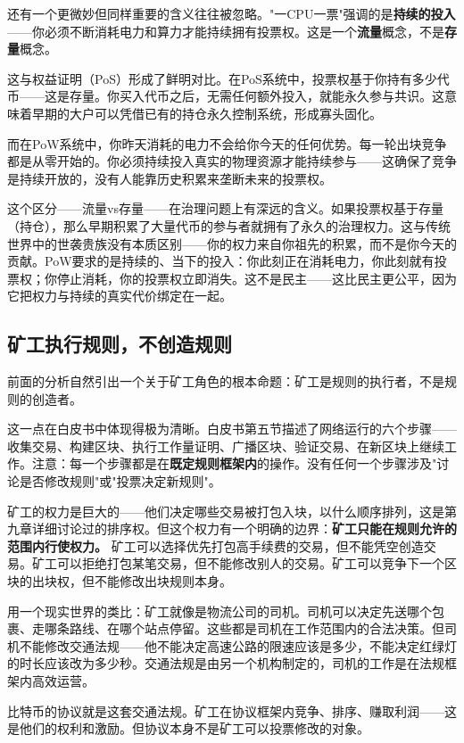 \documentclass[a4paper,12pt,openany]{ctexbook}
\begin{document}
还有一个更微妙但同样重要的含义往往被忽略。"一CPU一票"强调的是\textbf{持续的投入}——你必须不断消耗电力和算力才能持续拥有投票权。这是一个\textbf{流量}概念，不是\textbf{存量}概念。

这与权益证明（PoS）形成了鲜明对比。在PoS系统中，投票权基于你持有多少代币——这是存量。你买入代币之后，无需任何额外投入，就能永久参与共识。这意味着早期的大户可以凭借已有的持仓永久控制系统，形成寡头固化。

而在PoW系统中，你昨天消耗的电力不会给你今天的任何优势。每一轮出块竞争都是从零开始的。你必须持续投入真实的物理资源才能持续参与——这确保了竞争是持续开放的，没有人能靠历史积累来垄断未来的投票权。

这个区分——流量vs存量——在治理问题上有深远的含义。如果投票权基于存量（持仓），那么早期积累了大量代币的参与者就拥有了永久的治理权力。这与传统世界中的世袭贵族没有本质区别——你的权力来自你祖先的积累，而不是你今天的贡献。PoW要求的是持续的、当下的投入：你此刻正在消耗电力，你此刻就有投票权；你停止消耗，你的投票权立即消失。这不是民主——这比民主更公平，因为它把权力与持续的真实代价绑定在一起。


\subsection*{矿工执行规则，不创造规则}


前面的分析自然引出一个关于矿工角色的根本命题：矿工是规则的执行者，不是规则的创造者。

这一点在白皮书中体现得极为清晰。白皮书第五节描述了网络运行的六个步骤——收集交易、构建区块、执行工作量证明、广播区块、验证交易、在新区块上继续工作。注意：每一个步骤都是在\textbf{既定规则框架内}的操作。没有任何一个步骤涉及"讨论是否修改规则"或"投票决定新规则"。

矿工的权力是巨大的——他们决定哪些交易被打包入块，以什么顺序排列，这是第九章详细讨论过的排序权。但这个权力有一个明确的边界：\textbf{矿工只能在规则允许的范围内行使权力。} 矿工可以选择优先打包高手续费的交易，但不能凭空创造交易。矿工可以拒绝打包某笔交易，但不能修改别人的交易。矿工可以竞争下一个区块的出块权，但不能修改出块规则本身。

用一个现实世界的类比：矿工就像是物流公司的司机。司机可以决定先送哪个包裹、走哪条路线、在哪个站点停留。这些都是司机在工作范围内的合法决策。但司机不能修改交通法规——他不能决定高速公路的限速应该是多少，不能决定红绿灯的时长应该改为多少秒。交通法规是由另一个机构制定的，司机的工作是在法规框架内高效运营。

比特币的协议就是这套交通法规。矿工在协议框架内竞争、排序、赚取利润——这是他们的权利和激励。但协议本身不是矿工可以投票修改的对象。
\end{document}
